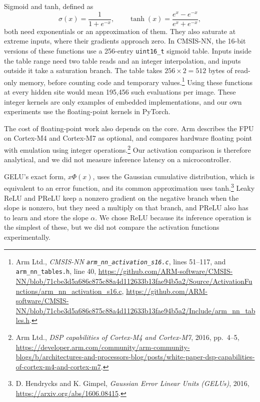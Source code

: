 \documentclass[11pt]{article}
\begin{document}
Sigmoid and tanh, defined as
\begin{equation}
  \sigma(x)=\frac{1}{1+e^{-x}}, \qquad
  \tanh(x)=\frac{e^x-e^{-x}}{e^x+e^{-x}},
\end{equation}
both need exponentials or an approximation of them.  They also saturate at
extreme inputs, where their gradients approach zero.  In CMSIS-NN,
the 16-bit versions of these functions use a 256-entry \texttt{uint16\_t}
sigmoid table.  Inputs inside the table range need two table reads and an
integer interpolation, and inputs outside it take a saturation branch.  The
table takes $256\times2=512$ bytes of read-only memory, before counting code
and temporary values.\footnote{Arm Ltd., \emph{CMSIS-NN
\texttt{arm\_nn\_activation\_s16.c}}, lines 51--117, and
\texttt{arm\_nn\_tables.h}, line 40,
\url{https://github.com/ARM-software/CMSIS-NN/blob/71cbe3d5a686c875c88a4d112633b13fae94b5a2/Source/ActivationFunctions/arm_nn_activation_s16.c},
\url{https://github.com/ARM-software/CMSIS-NN/blob/71cbe3d5a686c875c88a4d112633b13fae94b5a2/Include/arm_nn_tables.h}.}
Using these functions at every hidden site would mean 195,456 such
evaluations per image.  These integer kernels are only examples of embedded
implementations, and our own experiments use the floating-point kernels in
PyTorch.

The cost of floating-point work also depends on the core.  Arm describes the
FPU on Cortex-M4 and Cortex-M7 as optional, and compares hardware floating
point with emulation using integer operations.\footnote{Arm Ltd.,
\emph{DSP capabilities of Cortex-M4 and Cortex-M7}, 2016, pp.~4--5,
\url{https://developer.arm.com/community/arm-community-blogs/b/architectures-and-processors-blog/posts/white-paper-dsp-capabilities-of-cortex-m4-and-cortex-m7}.}
Our activation comparison is therefore analytical, and we did not measure
inference latency on a microcontroller.

GELU's exact form, $x\Phi(x)$, uses the Gaussian cumulative distribution,
which is equivalent to an error function, and its common approximation uses
tanh.\footnote{D. Hendrycks and
K. Gimpel, \emph{Gaussian Error Linear Units (GELUs)}, 2016,
\url{https://arxiv.org/abs/1606.08415}.}
Leaky ReLU and PReLU keep a nonzero gradient on the negative branch when the
slope is nonzero, but they need a multiply on that branch, and PReLU also has
to learn and store the slope $\alpha$.  We chose ReLU because its inference
operation is the simplest of these, but we did not compare the activation
functions experimentally.
\end{document}
